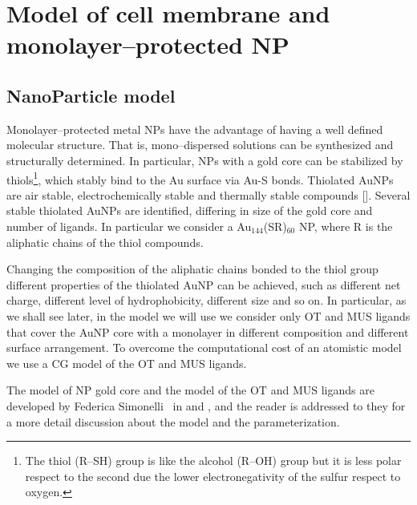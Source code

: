 \chapter{Model of cell membrane and monolayer--protected NP}

\section{NanoParticle model}
Monolayer--protected metal \acp{NP} have the advantage of having a well defined molecular structure. That is, mono--dispersed solutions can be synthesized and structurally determined. In particular, \acp{NP} with a gold core can be stabilized by thiols\footnote{The thiol (R--SH) group is like the alcohol (R--OH) group but it is less polar respect to the second due the lower electronegativity of the sulfur respect to oxygen.}, which stably bind to the Au surface via Au-S bonds. Thiolated Au\acp{NP} are air stable, electrochemically stable and thermally stable compounds []. Several stable thiolated Au\acp{NP} are identified, differing in size of the gold core and number of ligands. In particular we consider a {Au$_{144}$(SR)$_{60}$} \ac{NP}, where R is the aliphatic chains of the thiol compounds. 

Changing the composition of the aliphatic chains bonded to the thiol group different properties of the thiolated Au\ac{NP} can be achieved, such as different net charge, different level of hydrophobicity, different size and so on. In particular, as we shall see later, in the model we will use we consider only \ac{OT} and \ac{MUS} ligands that cover the Au\ac{NP} core with a monolayer in different composition and different surface arrangement. To overcome the computational cost of an atomistic model we use a \martini \ac{CG} model of the \ac{OT} and \ac{MUS} ligands. 

The model of \ac{NP} gold core and the \martini model of the \ac{OT} and \ac{MUS} ligands are developed by Federica Simonelli \etal\, in \cite{ourPaper} and \cite{simonelliThesis}, and the reader is addressed to they for a more detail discussion about the model and the parameterization.


